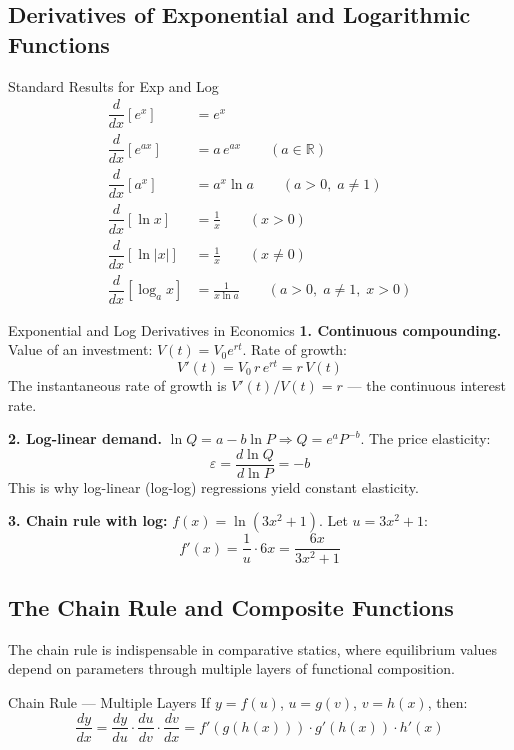 \documentclass[12pt, a4paper]{article}
\theoremstyle{definition}
\newcommand{\R}{\mathbb{R}}
\newcommand{\dd}[1]{\dfrac{d}{d#1}}
\newcommand{\ddd}[2]{\dfrac{d#1}{d#2}}
\begin{document}
\subsection{Derivatives of Exponential and Logarithmic Functions}

\begin{keybox}{Standard Results for Exp and Log}
\begin{align*}
  \dd{x}[e^x] &= e^x \\[4pt]
  \dd{x}[e^{ax}] &= a\,e^{ax} \qquad (a\in\R) \\[4pt]
  \dd{x}[a^x] &= a^x\ln a \qquad (a>0,\;a\neq 1)\\[4pt]
  \dd{x}[\ln x] &= \frac{1}{x} \qquad (x>0) \\[4pt]
  \dd{x}[\ln|x|] &= \frac{1}{x} \qquad (x\neq 0) \\[4pt]
  \dd{x}[\log_a x] &= \frac{1}{x\ln a} \qquad (a>0,\;a\neq 1,\;x>0)
\end{align*}
\end{keybox}

\begin{exbox}{Exponential and Log Derivatives in Economics}
\textbf{1. Continuous compounding.}  Value of an investment:
$V(t) = V_0 e^{rt}$.  Rate of growth:
\[
  V'(t) = V_0\,r\,e^{rt} = r\,V(t)
\]
The instantaneous rate of growth is $V'(t)/V(t) = r$ --- the continuous
interest rate.

\textbf{2. Log-linear demand.}
$\ln Q = a - b\ln P \Rightarrow Q = e^a P^{-b}$.  The price elasticity:
\[
  \varepsilon = \ddd{\ln Q}{\ln P} = -b
\]
This is why log-linear (log-log) regressions yield constant elasticity.

\textbf{3. Chain rule with log:}
$f(x) = \ln(3x^2+1)$.  Let $u = 3x^2+1$:
\[
  f'(x) = \frac{1}{u}\cdot 6x = \frac{6x}{3x^2+1}
\]
\end{exbox}

\subsection{The Chain Rule and Composite Functions}

The chain rule is indispensable in comparative statics, where equilibrium values
depend on parameters through multiple layers of functional composition.

\begin{keybox}{Chain Rule --- Multiple Layers}
If $y = f(u)$, $u = g(v)$, $v = h(x)$, then:
\[
  \ddd{y}{x} = \ddd{y}{u}\cdot\ddd{u}{v}\cdot\ddd{v}{x}
             = f'(g(h(x)))\cdot g'(h(x))\cdot h'(x)
\]
\end{keybox}
\end{document}

